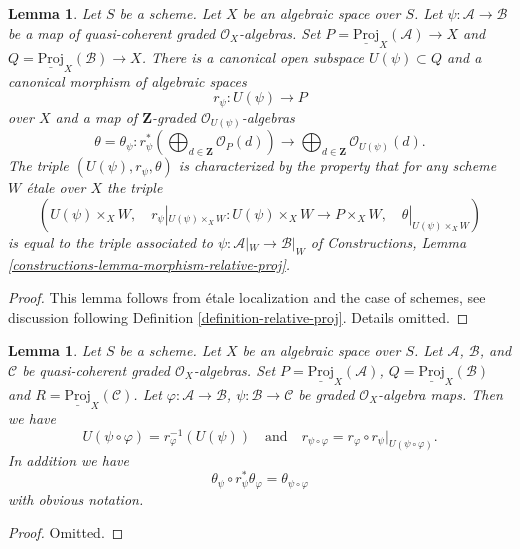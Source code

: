 \documentclass{stacks-project}
\theoremstyle{plain}
\newtheorem{lemma}[subsection]{Lemma}
\theoremstyle{definition}
\theoremstyle{remark}
\numberwithin{equation}{subsection}
\begin{document}
\begin{lemma}
\label{lemma-morphism-relative-proj}
Let $S$ be a scheme. Let $X$ be an algebraic space over $S$.
Let $\psi : \mathcal{A} \to \mathcal{B}$ be a map of
quasi-coherent graded $\mathcal{O}_X$-algebras. Set
$P = \underline{\text{Proj}}_X(\mathcal{A}) \to X$ and
$Q = \underline{\text{Proj}}_X(\mathcal{B}) \to X$.
There is a canonical open subspace
$U(\psi) \subset Q$ and a canonical morphism of
algebraic spaces
$$
r_\psi :
U(\psi)
\longrightarrow
P
$$
over $X$ and a map of $\mathbf{Z}$-graded $\mathcal{O}_{U(\psi)}$-algebras
$$
\theta = \theta_\psi :
r_\psi^*\left(
\bigoplus\nolimits_{d \in \mathbf{Z}} \mathcal{O}_P(d)
\right)
\longrightarrow
\bigoplus\nolimits_{d \in \mathbf{Z}} \mathcal{O}_{U(\psi)}(d).
$$
The triple $(U(\psi), r_\psi, \theta)$ is characterized by the property
that for any scheme $W$ \'etale over $X$ the triple
$$
(U(\psi) \times_X W,\quad
r_\psi|_{U(\psi) \times_X W} : U(\psi) \times_X W \to  P \times_X W,\quad
\theta|_{U(\psi) \times_X W})
$$
is equal to the triple associated to $\psi : \mathcal{A}|_W \to \mathcal{B}|_W$
of Constructions, Lemma \ref{constructions-lemma-morphism-relative-proj}.
\end{lemma}

\begin{proof}
This lemma follows from \'etale localization and the case of schemes, see
discussion following
Definition \ref{definition-relative-proj}. Details omitted.
\end{proof}

\begin{lemma}
\label{lemma-morphism-relative-proj-transitive}
Let $S$ be a scheme. Let $X$ be an algebraic space over $S$.
Let $\mathcal{A}$, $\mathcal{B}$, and $\mathcal{C}$ be
quasi-coherent graded $\mathcal{O}_X$-algebras.
Set $P = \underline{\text{Proj}}_X(\mathcal{A})$,
$Q = \underline{\text{Proj}}_X(\mathcal{B})$ and
$R = \underline{\text{Proj}}_X(\mathcal{C})$.
Let $\varphi : \mathcal{A} \to \mathcal{B}$,
$\psi : \mathcal{B} \to \mathcal{C}$ be graded $\mathcal{O}_X$-algebra maps.
Then we have
$$
U(\psi \circ \varphi) = r_\varphi^{-1}(U(\psi))
\quad
\text{and}
\quad
r_{\psi \circ \varphi}
=
r_\varphi \circ r_\psi|_{U(\psi \circ \varphi)}.
$$
In addition we have
$$
\theta_\psi \circ r_\psi^*\theta_\varphi
=
\theta_{\psi \circ \varphi}
$$
with obvious notation.
\end{lemma}

\begin{proof}
Omitted.
\end{proof}
\end{document}
